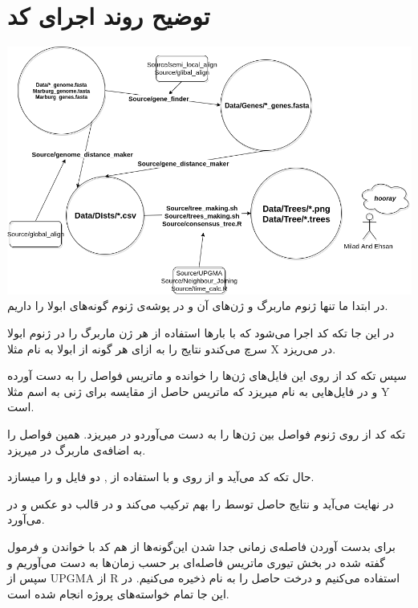 \documentclass[11pt]{article}
\begin{document}
\section{توضیح روند اجرای کد}
\includegraphics[scale = 0.5]{make_file.png}
در ابتدا ما تنها ژنوم ماربرگ و ژن‌های آن و در پوشه‌ی
ژنوم گونه‌‌های ابولا را داریم.

 در این جا تکه کد
اجرا می‌شود که با بارها استفاده از 
هر ژن ماربرگ را در ژنوم ابولا سرچ می‌کندو نتایج را به ازای هر گونه از ابولا به نام مثلا X در 
می‌ریزد.

 سپس تکه کد
از روی این فایل‌های ژن‌ها را خوانده و ماتریس فواصل را به دست آورده و در فایل‌هایی به نام 
میریزد که ماتریس حاصل از مقایسه برای ژنی به اسم مثلا Y است. 

 تکه کد
از روی ژنوم فواصل بین ژن‌ها را به دست می‌آورد\newline و در 
میریزد.
 \newline
همین فواصل را به اضافه‌ی  ماربرگ در 
میریزد.

 حال تکه کد 
می‌آید و از روی 
 و با استفاده از 
 , 
 دو فایل 
 و 
  را میسازد. 
  
  
  در نهایت 
  می‌آید و نتایج حاصل توسط
   را بهم ترکیب می‌کند و در قالب دو عکس
 و 
  در می‌آورد.
  
  
  برای بدست آوردن فاصله‌ی زمانی جدا شدن این‌گونه‌ها از هم کد 
  با خواندن
  و فرمول گفته شده در بخش تیوری ماتریس فاصله‌ای بر حسب زمان‌ها به دست می‌آوریم و سپس از UPGMA از R استفاده می‌کنیم و درخت حاصل را به نام 
  ذخیره می‌کنیم. در این جا تمام خواسته‌های پروژه انجام شده است.
 
\end{document}
